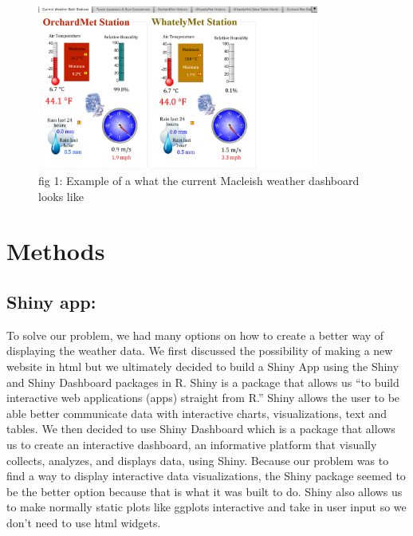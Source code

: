 \documentclass[10pt,letterpaper]{article}
\begin{document}
\begin{figure}
\includegraphics[width=350px]{current} \caption{fig 1: Example of a what the current Macleish weather dashboard looks like}\label{fig:unnamed-chunk-1}
\end{figure}

\section{Methods}\label{methods}

\subsection{Shiny app:}\label{shiny-app}

To solve our problem, we had many options on how to create a better way
of displaying the weather data. We first discussed the possibility of
making a new website in html but we ultimately decided to build a Shiny
App using the Shiny and Shiny Dashboard packages in R. Shiny is a
package that allows us ``to build interactive web applications (apps)
straight from R.'' Shiny allows the user to be able better communicate
data with interactive charts, visualizations, text and tables. We then
decided to use Shiny Dashboard which is a package that allows us to
create an interactive dashboard, an informative platform that visually
collects, analyzes, and displays data, using Shiny. Because our problem
was to find a way to display interactive data visualizations, the Shiny
package seemed to be the better option because that is what it was built
to do. Shiny also allows us to make normally static plots like ggplots
interactive and take in user input so we don't need to use html widgets.
\end{document}
